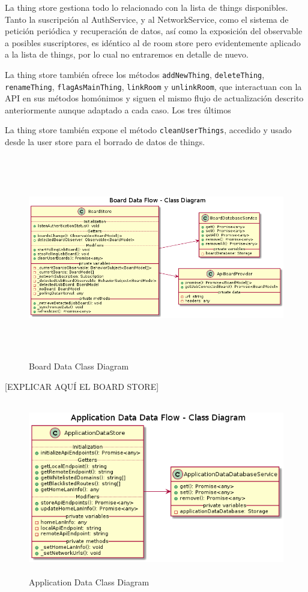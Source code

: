 La thing store gestiona todo lo relacionado con la lista de things disponibles. Tanto la suscripción al AuthService, y al NetworkService, como el sistema de petición periódica y recuperación de datos, así como la exposición del observable a posibles suscriptores, es idéntico al de room store pero evidentemente aplicado a la lista de things, por lo cual no entraremos en detalle de nuevo.

\vspace{0.5cm}

La thing store también ofrece los métodos \verb|addNewThing|, \verb|deleteThing|, \verb|renameThing|, \verb|flagAsMainThing|, \verb|linkRoom| y \verb|unlinkRoom|, que interactuan con la API en sus métodos homónimos y siguen el mismo flujo de actualización descrito anteriormente aunque adaptado a cada caso. Los tres últimos 

La thing store también expone el método \verb|cleanUserThings|, accedido y usado desde la user store para el borrado de datos de things.


\begin{figure}[hbt!]
\centering
\includegraphics[height=3.5in]{figures/diagrams/front/data-flow/board.png}
\caption[thing]{Board Data Class Diagram\footnotemark}
\end{figure}

[EXPLICAR AQUÍ EL BOARD STORE]

\begin{figure}[hbt!]
\centering
\includegraphics[height=3in]{figures/diagrams/front/data-flow/app-data.png}
\caption[app-data]{Application Data Class Diagram\footnotemark}
\end{figure}

